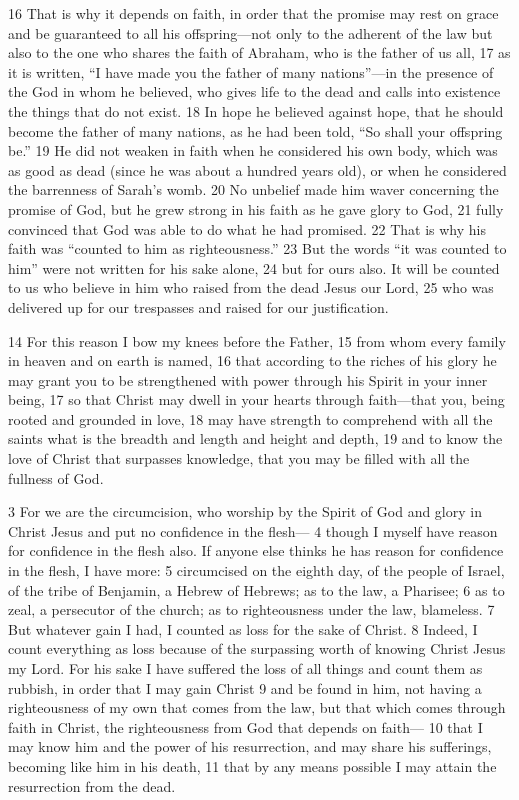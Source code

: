 \begin{bible}
16 That is why it depends on faith, in order that the promise may rest on grace and be guaranteed to all his offspring—not only to the adherent of the law but also to the one who shares the faith of Abraham, who is the father of us all, 17 as it is written, ``I have made you the father of many nations''—in the presence of the God in whom he believed, who gives life to the dead and calls into existence the things that do not exist. 18 In hope he believed against hope, that he should become the father of many nations, as he had been told, ``So shall your offspring be.'' 19 He did not weaken in faith when he considered his own body, which was as good as dead (since he was about a hundred years old), or when he considered the barrenness of Sarah's womb. 20 No unbelief made him waver concerning the promise of God, but he grew strong in his faith as he gave glory to God, 21 fully convinced that God was able to do what he had promised. 22 That is why his faith was ``counted to him as righteousness.'' 23 But the words ``it was counted to him'' were not written for his sake alone, 24 but for ours also. It will be counted to us who believe in him who raised from the dead Jesus our Lord, 25 who was delivered up for our trespasses and raised for our justification.

14 For this reason I bow my knees before the Father, 15 from whom every family in heaven and on earth is named, 16 that according to the riches of his glory he may grant you to be strengthened with power through his Spirit in your inner being, 17 so that Christ may dwell in your hearts through faith—that you, being rooted and grounded in love, 18 may have strength to comprehend with all the saints what is the breadth and length and height and depth, 19 and to know the love of Christ that surpasses knowledge, that you may be filled with all the fullness of God.

3 For we are the circumcision, who worship by the Spirit of God and glory in Christ Jesus and put no confidence in the flesh— 4 though I myself have reason for confidence in the flesh also. If anyone else thinks he has reason for confidence in the flesh, I have more: 5 circumcised on the eighth day, of the people of Israel, of the tribe of Benjamin, a Hebrew of Hebrews; as to the law, a Pharisee; 6 as to zeal, a persecutor of the church; as to righteousness under the law, blameless. 7 But whatever gain I had, I counted as loss for the sake of Christ. 8 Indeed, I count everything as loss because of the surpassing worth of knowing Christ Jesus my Lord. For his sake I have suffered the loss of all things and count them as rubbish, in order that I may gain Christ 9 and be found in him, not having a righteousness of my own that comes from the law, but that which comes through faith in Christ, the righteousness from God that depends on faith— 10 that I may know him and the power of his resurrection, and may share his sufferings, becoming like him in his death, 11 that by any means possible I may attain the resurrection from the dead.


\end{bible}
